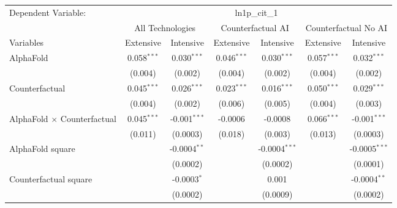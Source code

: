 \begingroup
\centering
\begin{tabular}{lcccccc}
   \tabularnewline \midrule \midrule
   Dependent Variable: & \multicolumn{6}{c}{ln1p\_cit\_1}\\
 & \multicolumn{2}{c}{All Technologies} & \multicolumn{2}{c}{Counterfactual AI} & \multicolumn{2}{c}{Counterfactual No AI} \\
\cmidrule(lr){1-1}\cmidrule(lr){2-3} \cmidrule(lr){4-5} \cmidrule(lr){6-7}
Variables & \multicolumn{1}{c}{Extensive} & \multicolumn{1}{c}{Intensive} & \multicolumn{1}{c}{Extensive} & \multicolumn{1}{c}{Intensive} & \multicolumn{1}{c}{Extensive} & \multicolumn{1}{c}{Intensive} \\
\cmidrule(lr){1-1}\cmidrule(lr){2-2} \cmidrule(lr){3-3} \cmidrule(lr){4-4} \cmidrule(lr){5-5} \cmidrule(lr){6-6} \cmidrule(lr){7-7}
   AlphaFold                          & 0.058$^{***}$ & 0.030$^{***}$     & 0.046$^{***}$ & 0.030$^{***}$   & 0.057$^{***}$ & 0.032$^{***}$\\   
                                      & (0.004)       & (0.002)           & (0.004)       & (0.002)         & (0.004)       & (0.002)\\   
   Counterfactual                     & 0.045$^{***}$ & 0.026$^{***}$     & 0.023$^{***}$ & 0.016$^{***}$   & 0.050$^{***}$ & 0.029$^{***}$\\   
                                      & (0.004)       & (0.002)           & (0.006)       & (0.005)         & (0.004)       & (0.003)\\   
   AlphaFold $\times$ Counterfactual  & 0.045$^{***}$ & -0.001$^{***}$    & -0.0006       & -0.0008         & 0.066$^{***}$ & -0.001$^{***}$\\   
                                      & (0.011)       & (0.0003)          & (0.018)       & (0.003)         & (0.013)       & (0.0003)\\   
   AlphaFold square                   &               & -0.0004$^{**}$    &               & -0.0004$^{***}$ &               & -0.0005$^{***}$\\   
                                      &               & (0.0002)          &               & (0.0002)        &               & (0.0001)\\   
   Counterfactual square              &               & -0.0003$^{*}$     &               & 0.001           &               & -0.0004$^{**}$\\   
                                      &               & (0.0002)          &               & (0.0009)        &               & (0.0002)\\   

\end{tabular}
